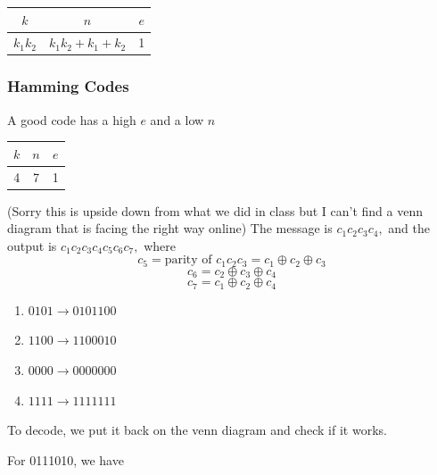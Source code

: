 \documentclass[12pt]{article}
\begin{document}
\bigskip
\begin{tabular}{|c|c|c|}
    \hline
    $k$&$n$&$e$\\
    \hline
    $k_1k_2$&$k_1k_2+k_1+k_2$&1 \\
    \hline
\end{tabular}
\subsubsection{Hamming Codes}
A good code has a high $e$ and a low $n$
\begin{tabular}{|c|c|c|}
\hline
    $k$&$n$&$e$ \\
    \hline
    4&7&1 \\
    \hline
\end{tabular}


(Sorry this is upside down from what we did in class but I can't find a venn diagram that is facing the right way online)
The message is $c_1c_2c_3c_4,$ and the output is $c_1c_2c_3c_4c_5c_6c_7,$
where
\[c_5=\text{parity of }c_1c_2c_3=c_1\oplus c_2\oplus c_3\]
\[c_6=c_2\oplus c_3\oplus c_4\]
\[c_7=c_1\oplus c_2\oplus c_4\]

\begin{enumerate}
\item $0101\to0101100$
\item $1100\to1100010$
\item $0000\to0000000$
\item $1111\to1111111$
\end{enumerate}
To decode, we put it back on the venn diagram and check if it works.

For 0111010, we have
\end{document}
